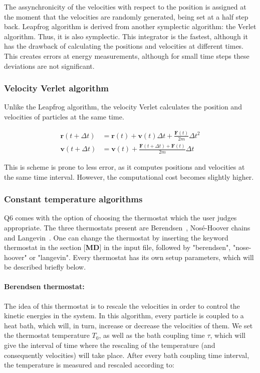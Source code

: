 \documentclass[a4paper,11pt]{article}
\let\origcite\cite
\def\cite#1{\unskip~\origcite{#1}}
\begin{document}
The assynchronicity of the velocities with respect to the position is assigned 
at the moment that the velocities are randomly generated, being set at a half step 
back. Leapfrog algorithm is derived from another symplectic algorithm: the 
Verlet algorithm. Thus, it is also symplectic. This integrator is the fastest, 
although it has the drawback of calculating the positions and velocities at 
different times. This creates errors at energy measurements, although for small 
time steps these deviations are not significant.

\subsubsection{Velocity Verlet algorithm}
Unlike the Leapfrog algorithm, the velocity Verlet calculates the position and 
velocities of particles at the same time.

\begin{align}
 \textbf{r}(t+\Delta t) &= \textbf{r}(t) + \textbf{v}(t)\Delta t + \frac{\textbf{F}(t)}{2m}
\Delta t^2 \\
 \textbf{v}(t+\Delta t) &= \textbf{v}(t) + \frac{\textbf{F}(t+\Delta t) + 
\textbf{F}(t)}{2m}\Delta t
\end{align}

This is scheme is prone to less error, as it computes positions and velocities 
at the same time interval. However, the computational cost becomes slightly higher.

\subsubsection{Constant temperature algorithms}
Q6 comes with the option of choosing the thermostat which the user
judges appropriate. The three thermostats present are
Berendsen\cite{Berendsen1984}, Nos\'e-Hoover chains\cite{Martyna1992}
 and Langevin\cite{Schneider1978}. One can change the thermostat
by inserting the keyword thermostat in the section [\textbf{MD}]
in the input file, followed by "berendsen", "nose-hoover" or "langevin".
Every thermostat has its own setup parameters, which will be described
briefly below.

\paragraph{Berendsen thermostat:}

The idea of this thermostat is to rescale the velocities in order
to control the kinetic energies in the system. In this algorithm,
every particle is coupled to a heat bath, which will, in turn,
increase or decrease the velocities of them. We set the thermostat
temperature $T_{0}$, as well as the bath coupling time $\tau$,
which will give the interval of time where the rescaling of the
temperature (and consequently velocities) will take place. After every
bath coupling time interval, the temperature is measured and rescaled
according to:
\end{document}

